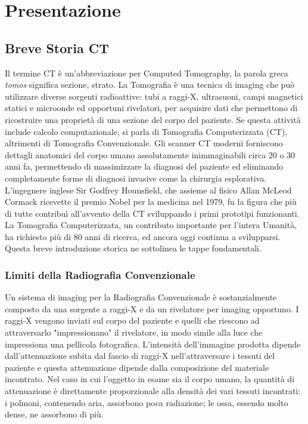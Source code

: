 \documentclass[a4paper,12pt, doubleside]{report}
\begin{document}
    
    \newpage
    \tableofcontents
    \newpage
    \chapter{Presentazione}
        \section{Breve Storia CT}
            \par
                Il termine CT è un'abbreviazione per Computed Tomography, la parola greca \textit{tomos} significa sezione, strato. La Tomografia è una tecnica di imaging che può utilizzare diverse sorgenti radioattive: tubi a raggi-X, ultrasuoni, campi magnetici statici e microonde ed opportuni rivelatori, per acquisire dati che permettono di ricostruire una proprietà di una sezione del corpo del paziente. Se questa attività include calcolo computazionale, si parla di Tomografia Computerizzata (CT), altrimenti di Tomografia Convenzionale. Gli scanner CT moderni forniscono dettagli anatomici del corpo umano assolutamente inimmaginabili circa 20 o 30 anni fa, permettendo di massimizzare la diagnosi del paziente ed eliminando completamente forme di diagnosi invasive come la chirurgia esplorativa. L'ingegnere inglese Sir Godfrey Hounsfield, che assieme al fisico Allan McLeod Cormack ricevette il premio Nobel per la medicina nel 1979, fu la figura che più di tutte contribuì all'avvento della CT sviluppando i primi prototipi funzionanti. La Tomografia Computerizzata, un contributo importante per l'intera Umanità, ha richiesto più di 80 anni di ricerca, ed ancora oggi continua a svilupparsi. Questa breve introduzione storica ne sottolinea le tappe fondamentali.
            
            \subsection{Limiti della Radiografia Convenzionale}
                \par
                    Un sistema di imaging per la Radiografia Convenzionale è sostanzialmente composto da una sorgente a raggi-X e da un rivelatore per imaging opportuno. I raggi-X vengono inviati sul corpo del paziente e quelli che riescono ad attraversarlo "impressionano" il rivelatore, in modo simile alla luce che impressiona una pellicola fotografica. L'intensità dell'immagine prodotta dipende dall'attenuazione subita dal fascio di raggi-X nell'attraversare i tessuti del paziente e questa attenuazione dipende dalla composizione del materiale incontrato. Nel caso in cui l’oggetto in esame sia il corpo umano, la quantità di attenuazione è direttamente proporzionale alla densità dei vari tessuti incontrati: i polmoni, contenendo aria, assorbono poca radiazione; le ossa, essendo molto dense, ne assorbono di più.
                            
\end{document}
